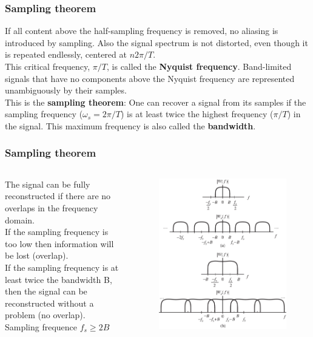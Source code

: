 \begin{frame}
	\frametitle{Sampling theorem}
	If all content above the half-sampling frequency is removed, no aliasing is introduced by sampling. Also the signal spectrum is not distorted, even though it is repeated endlessly, centered at $n2\pi/T$.\\
	\medskip
	This critical frequency, $\pi/T$, is called the \textbf{Nyquist frequency}. Band-limited signals that have no components above the Nyquist frequency are represented unambiguously by their samples. \\
	\medskip
	This is the \textbf{sampling theorem}: One can recover a signal from its samples if the sampling frequency ($\omega_s=2\pi/T$) is at least twice the highest frequency ($\pi/T$) in the signal. This maximum frequency is also called the \textbf{bandwidth}.
\end{frame}

\begin{frame}
	\frametitle{Sampling theorem}
	\begin{columns}
		The signal can be fully reconstructed if there are no overlaps in the frequency domain.\\
		If the sampling frequency is too low then information will be lost (overlap).\\
		If the sampling frequency is at least twice the bandwidth B, then the signal can be reconstructed without a problem (no overlap).\\
		\medskip
		Sampling frequence $f_s \geq 2 B$
		\begin{figure}
			\includegraphics[width=1\linewidth]{nyquist}
		\end{figure}
	\end{columns}
\end{frame}

